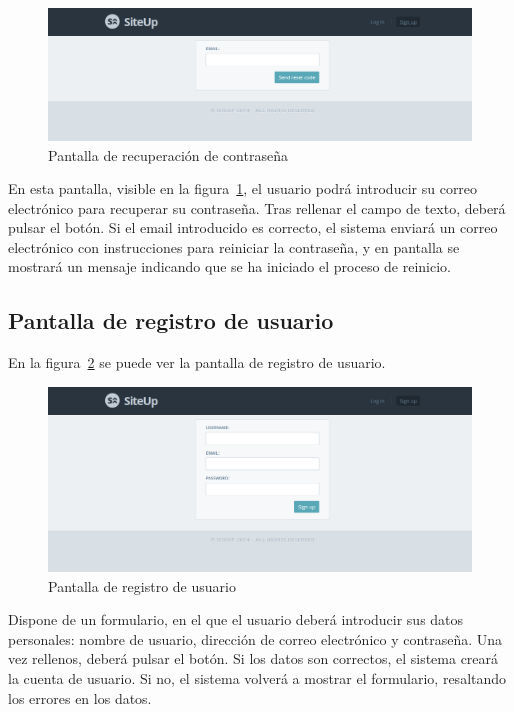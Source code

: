 \begin{figure}[htbp]
  \centering
  \includegraphics[width=\textwidth]{5_diseno/web-forgot-password}
  \caption{Pantalla de recuperación de contraseña}
  \label{fig:web-forgot-password}
\end{figure}

En esta pantalla, visible en la figura~\ref{fig:web-forgot-password}, el usuario
podrá introducir su correo electrónico para recuperar su contraseña. Tras
rellenar el campo de texto, deberá pulsar el botón. Si el email introducido es
correcto, el sistema enviará un correo electrónico con instrucciones para
reiniciar la contraseña, y en pantalla se mostrará un mensaje indicando que se
ha iniciado el proceso de reinicio.


\subsection{Pantalla de registro de usuario}

En la figura~\ref{fig:web-register} se puede ver la pantalla de registro de
usuario.

\begin{figure}[htbp]
  \centering
  \includegraphics[width=\textwidth]{5_diseno/web-register}
  \caption{Pantalla de registro de usuario}
  \label{fig:web-register}
\end{figure}

Dispone de un formulario, en el que el usuario deberá introducir sus datos
personales: nombre de usuario, dirección de correo electrónico y contraseña. Una
vez rellenos, deberá pulsar el botón. Si los datos son correctos, el sistema
creará la cuenta de usuario. Si no, el sistema volverá a mostrar el formulario,
resaltando los errores en los datos.

